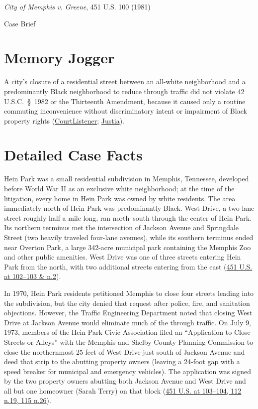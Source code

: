 \documentclass[12pt]{article}
\begin{document}
\begin{center}
{\LARGE \textit{City of Memphis v. Greene}, 451 U.S. 100 (1981)\par}
\vspace{0.8em}
{\large Case Brief\par}
\end{center}
\vspace{1em}

\section{Memory Jogger}

A city's closure of a residential street between an all-white neighborhood and a predominantly Black neighborhood to reduce through traffic did not violate 42 U.S.C.\ \S~1982 or the Thirteenth Amendment, because it caused only a routine commuting inconvenience without discriminatory intent or impairment of Black property rights (\href{https://www.courtlistener.com/opinion/110461/city-of-memphis-v-greene/}{CourtListener}; \href{https://supreme.justia.com/cases/federal/us/451/100/}{Justia}).

\section{Detailed Case Facts}

Hein Park was a small residential subdivision in Memphis, Tennessee, developed before World War II as an exclusive white neighborhood; at the time of the litigation, every home in Hein Park was owned by white residents. The area immediately north of Hein Park was predominantly Black. West Drive, a two-lane street roughly half a mile long, ran north--south through the center of Hein Park. Its northern terminus met the intersection of Jackson Avenue and Springdale Street (two heavily traveled four-lane avenues), while its southern terminus ended near Overton Park, a large 342-acre municipal park containing the Memphis Zoo and other public amenities. West Drive was one of three streets entering Hein Park from the north, with two additional streets entering from the east (\href{https://supreme.justia.com/cases/federal/us/451/100/}{451 U.S. at 102--103 \& n.2}).

In 1970, Hein Park residents petitioned Memphis to close four streets leading into the subdivision, but the city denied that request after police, fire, and sanitation objections. However, the Traffic Engineering Department noted that closing West Drive at Jackson Avenue would eliminate much of the through traffic. On July 9, 1973, members of the Hein Park Civic Association filed an ``Application to Close Streets or Alleys'' with the Memphis and Shelby County Planning Commission to close the northernmost 25 feet of West Drive just south of Jackson Avenue and deed that strip to the abutting property owners (leaving a 24-foot gap with a speed breaker for municipal and emergency vehicles). The application was signed by the two property owners abutting both Jackson Avenue and West Drive and all but one homeowner (Sarah Terry) on that block (\href{https://supreme.justia.com/cases/federal/us/451/100/}{451 U.S. at 103--104, 112 n.19, 115 n.26}).
\end{document}
